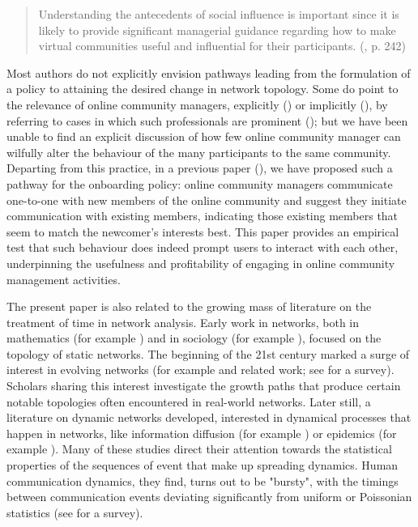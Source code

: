 \begin{quotation}
Understanding the antecedents of social influence is important since it is likely to provide significant managerial guidance regarding how to make virtual communities useful and influential for their participants. (\cite{dholakia2004social}, p. 242) 
\end{quotation}

Most authors do not explicitly envision pathways leading from the formulation of a policy to attaining the desired change in network topology. Some do point to the relevance of online community managers, explicitly (\cite{dholakia2004social}) or implicitly (\cite{toral2009empirical}), by referring to cases in which such professionals are prominent (\cite{rheingold1993virtual}); but we have been unable to find an explicit discussion of how few online community manager can wilfully alter the behaviour of the many participants to the same community. Departing from this practice, in a previous paper (\cite{cottica2015online}), we have proposed such a pathway for the onboarding policy: online community managers communicate one-to-one with new members of the online community and suggest they initiate communication with existing members, indicating those existing members that seem to match the newcomer's interests best. This paper provides an empirical test that such behaviour does indeed prompt users to interact with each other, underpinning the usefulness and profitability of engaging in online community management activities.  

The present paper is also related to the growing mass of literature on the treatment of time in network analysis. Early work in networks, both in mathematics (for example \cite{erdds1959random}) and in sociology (for example \cite{moreno1937sociometry}), focused on the topology of static networks. The beginning of the 21st century marked a surge of interest in evolving networks (for example \cite{barabasi1999emergence} and related work; see \cite{dorogovtsev2002evolution} for a survey). Scholars sharing this interest investigate the growth paths that produce certain notable topologies often encountered in real-world networks. Later still, a literature on dynamic networks developed, interested in dynamical processes that happen in networks, like information diffusion (for example \cite{eckmann2004entropy}) or epidemics (for example \cite{rocha2011simulated}). Many of these studies direct their attention towards the statistical properties of the sequences of event that make up spreading dynamics. Human communication dynamics, they find, turns out to be "bursty", with the timings between communication events deviating significantly from uniform or Poissonian statistics  (see \cite{holme2012temporal} for a survey). 

